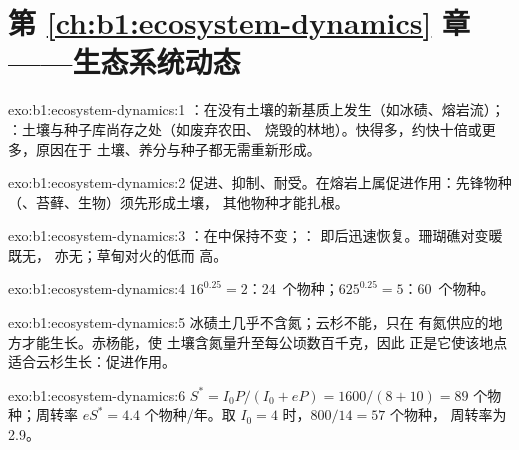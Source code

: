 \section*{第 \ref{ch:b1:ecosystem-dynamics} 章——生态系统动态}

\begin{solution}{exo:b1:ecosystem-dynamics:1}
：在没有土壤的新基质上发生（如冰碛、熔岩流）；
：土壤与种子库尚存之处（如废弃农田、
烧毁的林地）。快得多，约快十倍或更多，原因在于
土壤、养分与种子都无需重新形成。
\end{solution}

\begin{solution}{exo:b1:ecosystem-dynamics:2}
促进、抑制、耐受。在熔岩上属促进作用：先锋物种
（、苔藓、生物）须先形成土壤，
其他物种才能扎根。
\end{solution}

\begin{solution}{exo:b1:ecosystem-dynamics:3}
：在中保持不变；：
即后迅速恢复。珊瑚礁对变暖既无，
亦无；草甸对火的低而
高。
\end{solution}

\begin{solution}{exo:b1:ecosystem-dynamics:4}
$16^{0.25} = 2$：\num{24}~个物种；$625^{0.25} = 5$：\num{60}~个物种。
\end{solution}

\begin{solution}{exo:b1:ecosystem-dynamics:5}
冰碛土几乎不含氮；云杉不能，只在
有氮供应的地方才能生长。赤杨能，使
土壤含氮量升至每公顷数百千克，因此
正是它使该地点适合云杉生长：促进作用。
\end{solution}

\begin{solution}{exo:b1:ecosystem-dynamics:6}
$S^* = I_0 P/(I_0 + eP) = 1600/(8 + 10) = 89$ 个物种；周转率
$eS^* = 4.4$ 个物种/年。取 $I_0 = 4$ 时，$800/14 = 57$ 个物种，
周转率为 \num{2.9}。
\end{solution}

